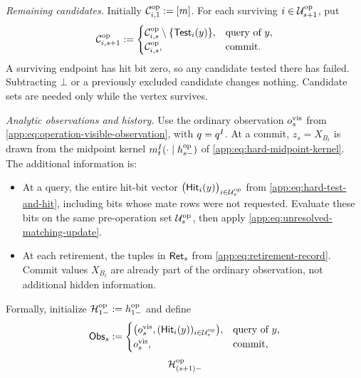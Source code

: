 \begin{definition*}
\emph{Remaining candidates.}
Initially \(\OpRemainingTriggers{i}{1}:=[\HardBankSize]\).
For each surviving \(i\in\OpUnresolvedVertices{s+1}\), put
\begin{equation}
 \OpRemainingTriggers{i}{s+1}:=
 \begin{cases}
  \OpRemainingTriggers{i}{s}\setminus\{\HardTest{y}{i}\},
       &\text{query of }y,\\
  \OpRemainingTriggers{i}{s},&\text{commit}.
 \end{cases}
 \label{app:eq:operation-candidates}
\end{equation}
A surviving endpoint has hit bit zero, so any candidate tested there
has failed. Subtracting \(\bot\) or a previously excluded candidate
changes nothing. Candidate sets are needed only while the vertex survives.

\emph{Analytic observations and history.}
Use the ordinary observation \(\OpVisibleObservation{s}\) from
\cref{app:eq:operation-visible-observation}, with
\(\FrozenOracle=\HardOracle{I}\). At a commit,
\(z_s=X_{B_t}\) is drawn from the midpoint kernel
\(\HardMidpointKernel{t}{I}(\cdot\mid\OpVisibleHistory{s})\)
of \cref{app:eq:hard-midpoint-kernel}.
The additional information is:
\begin{itemize}
\item At a query, the entire hit-bit vector
\(\bigl(\HardHit{y}{i}\bigr)_{i\in\OpUnresolvedVertices{s}}\)
from \cref{app:eq:hard-test-and-hit}, including bits whose mate rows
were not requested. Evaluate these bits on the same pre-operation
set \(\OpUnresolvedVertices{s}\), then apply
\cref{app:eq:unresolved-matching-update}.
\item At each retirement, the tuples in \(\OpRetiredRecord{s}\) from
\cref{app:eq:retirement-record}. Commit values \(X_{B_t}\) are already
part of the ordinary observation, not additional hidden information.
\end{itemize}
Formally, initialize \(\OpAnalyticHistory{1}:=\OpVisibleHistory{1}\)
and define
\begin{equation}
 \OpObservation{s}:=
 \begin{cases}
  \bigl(\OpVisibleObservation{s},
       (\HardHit{y}{i})_{i\in\OpUnresolvedVertices{s}}\bigr),
       &\text{query of }y,\\
  \OpVisibleObservation{s},&\text{commit},
 \end{cases}
 \label{app:eq:analytic-observation}
\end{equation}
\begin{equation}
 \OpAnalyticHistory{(s+1)}

\end{equation}
\end{definition*}
